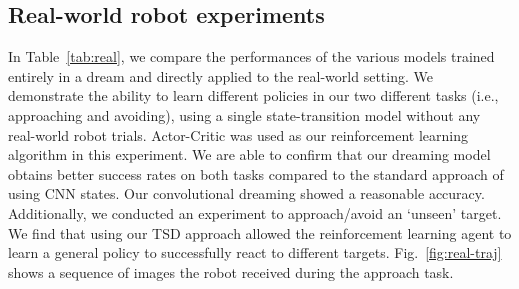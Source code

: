 \documentclass[letterpaper, 10 pt, conference]{ieeeconf}
\begin{document}






\subsection{Real-world robot experiments}
\label{sec:real}

In Table~\ref{tab:real}, we compare the performances of the various models trained entirely in a dream and directly applied to the real-world setting. We demonstrate the ability to learn different policies in our two different tasks (i.e., approaching and avoiding), using a single state-transition model without any real-world robot trials. Actor-Critic was used as our reinforcement learning algorithm in this experiment. We are able to confirm that our dreaming model obtains better success rates on both tasks compared to the standard approach of using CNN states. Our convolutional dreaming showed a reasonable accuracy. Additionally, we conducted an experiment to approach/avoid an `unseen' target. We find that using our TSD approach allowed the reinforcement learning agent to learn a general policy to successfully react to different targets. Fig.~\ref{fig:real-traj} shows a sequence of images the robot received during the approach task.
\end{document}

